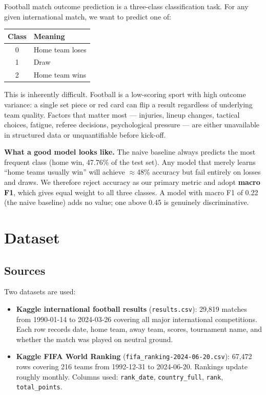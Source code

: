 \documentclass[12pt,a4paper,openany]{report}
\begin{document}
Football match outcome prediction is a three-class classification task. For any
given international match, we want to predict one of:

\begin{center}
\begin{tabular}{cl}
  \toprule
  \textbf{Class} & \textbf{Meaning} \\
  \midrule
  0 & Home team loses \\
  1 & Draw \\
  2 & Home team wins \\
  \bottomrule
\end{tabular}
\end{center}

\bigskip
This is inherently difficult. Football is a low-scoring sport with high outcome
variance: a single set piece or red card can flip a result regardless of
underlying team quality. Factors that matter most --- injuries, lineup changes,
tactical choices, fatigue, referee decisions, psychological pressure --- are
either unavailable in structured data or unquantifiable before kick-off.

\medskip
\textbf{What a good model looks like.} The naive baseline always predicts the most
frequent class (home win, 47.76\% of the test set). Any model that merely learns
``home teams usually win'' will achieve $\approx$48\% accuracy but fail entirely on losses
and draws. We therefore reject accuracy as our primary metric and adopt
\textbf{macro F1}, which gives equal weight to all three classes. A model with macro
F1 of 0.22 (the naive baseline) adds no value; one above 0.45 is genuinely
discriminative.

\chapter{Dataset}

\section{Sources}

Two datasets are used:

\begin{itemize}
  \item \textbf{Kaggle international football results} (\texttt{results.csv}): 29,819 matches
  from 1990-01-14 to 2024-03-26 covering all major international competitions.
  Each row records date, home team, away team, scores, tournament name, and
  whether the match was played on neutral ground.

  \item \textbf{Kaggle FIFA World Ranking} (\texttt{fifa\_ranking-2024-06-20.csv}): 67,472 rows
  covering 216 teams from 1992-12-31 to 2024-06-20. Rankings update roughly
  monthly. Columns used: \texttt{rank\_date}, \texttt{country\_full}, \texttt{rank}, \texttt{total\_points}.
\end{itemize}
\end{document}
